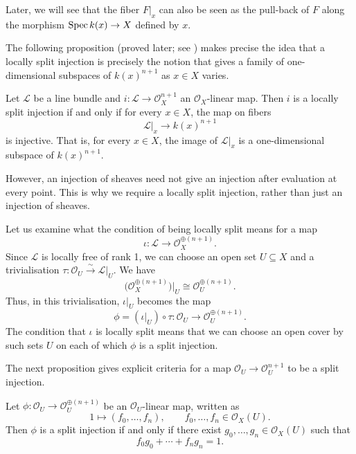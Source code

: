 \begin{remark}
    Later, we will see that the fiber \(F|_x\) can also be seen as
    the pull-back of \(F\) along the morphism \(\operatorname{Spec} k(x) \to X\)
    defined by \(x\).
\end{remark}

The following proposition (proved later; see
) makes precise the idea that a
locally split injection is precisely the notion that gives a family
of one-dimensional subspaces of \(k(x)^{n+1}\) as \(x \in X\) varies.
\begin{proposition}
    Let \(\mathcal{L}\) be a line bundle and \(i \colon \mathcal{L}
    \to \mathcal{O}_X^{n+1}\) an \(\mathcal{O}_X\)-linear map.
    Then \(i\) is a locally split injection if and only if for every
    \(x \in X\), the map on fibers
    \[ \mathcal{L}|_x \to k(x)^{n+1}\]
    is injective.
    That is, for every \(x \in X\), the image of \(\mathcal{L}|_x\)
    is a one-dimensional subspace of \(k(x)^{n+1}\).
\end{proposition}

However, an injection of sheaves need not give an injection
after evaluation at every point. This is why we require a locally split
injection, rather than just an injection of sheaves.

Let us examine what the condition of being locally split means for a map
\[
    \iota:\mathcal{L}\longrightarrow\mathcal{O}_X^{\oplus(n+1)}.
\]
Since \(\mathcal{L}\) is locally free of rank 1, we can choose an open set
\(U\subseteq X\) and a trivialisation
\(\tau:\mathcal{O}_U\xrightarrow{\sim}\mathcal{L}|_U\).
We have
\[
    \bigl(\mathcal{O}_X^{\oplus(n+1)}\bigr)|_U
    \cong\mathcal{O}_U^{\oplus(n+1)}.
\]
Thus, in this trivialisation, \(\iota|_U\) becomes the map
\[
    \phi=(\iota|_U)\circ\tau:
    \mathcal{O}_U\longrightarrow\mathcal{O}_U^{\oplus(n+1)}.
\]
The condition that \(\iota\) is locally split means that we can choose an
open cover by such sets \(U\) on each of which \(\phi\) is a split injection.

The next proposition gives explicit criteria for a map
\(\mathcal{O}_U \to \mathcal{O}_U^{n+1}\) to be a split injection.
\begin{proposition}\label{prop:lsi-section-criterion}
    Let \(\phi:\mathcal{O}_U\to\mathcal{O}_U^{\oplus(n+1)}\) be an
    \(\mathcal{O}_U\)-linear map, written as
    \[
        1\longmapsto(f_0,\dots,f_n),
        \qquad f_0,\dots,f_n\in\mathcal{O}_X(U).
    \]
    Then \(\phi\) is a split injection if and only if there exist
    \(g_0,\dots,g_n\in\mathcal{O}_X(U)\) such that
    \[
        f_0g_0+\cdots+f_ng_n=1.
    \]
\end{proposition}

